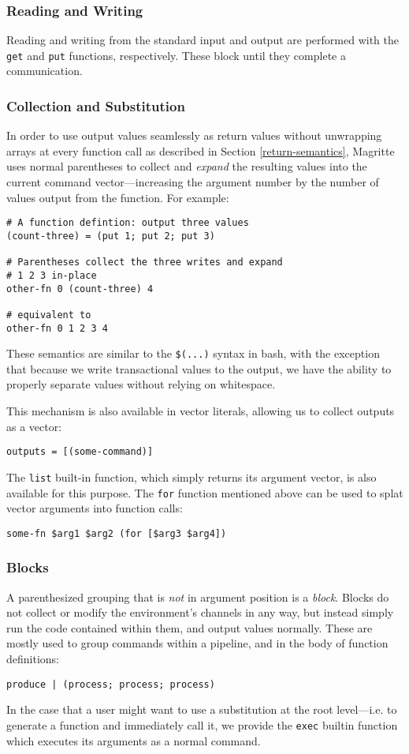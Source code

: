 \documentclass[english,PRO]{ipsj}
\begin{document}
\subsubsection{Reading and Writing}\noindent
Reading and writing from the standard input and output are performed with the \verb/get/ and \verb/put/ functions, respectively. These block until they complete a communication.

\subsubsection{Collection and Substitution}\noindent
In order to use output values seamlessly as return values without unwrapping arrays at every function call as described in Section \ref{return-semantics}, Magritte uses normal parentheses to collect and \emph{expand} the resulting values into the current command vector---increasing the argument number by the number of values output from the function. For example:
\begin{lstlisting}
# A function defintion: output three values
(count-three) = (put 1; put 2; put 3)

# Parentheses collect the three writes and expand
# 1 2 3 in-place
other-fn 0 (count-three) 4

# equivalent to
other-fn 0 1 2 3 4
\end{lstlisting}

\noindent
These semantics are similar to the \verb/$(...)/ syntax in bash, with the exception that because we write transactional values to the output, we have the ability to properly separate values without relying on whitespace.

This mechanism is also available in vector literals, allowing us to collect outputs as a vector:
\begin{lstlisting}
outputs = [(some-command)]
\end{lstlisting}
\noindent
The \verb/list/ built-in function, which simply returns its argument vector, is also available for this purpose.
The \verb/for/ function mentioned above can be used to splat vector arguments into function calls:
\begin{lstlisting}
some-fn $arg1 $arg2 (for [$arg3 $arg4])
\end{lstlisting}

\subsubsection{Blocks}\noindent
A parenthesized grouping that is \emph{not} in argument position is a \emph{block}. Blocks do not collect or modify the environment's channels in any way, but instead simply run the code contained within them, and output values normally. These are mostly used to group commands within a pipeline, and in the body of function definitions:
\begin{lstlisting}
produce | (process; process; process)
\end{lstlisting}
\noindent
In the case that a user might want to use a substitution at the root level---i.e. to generate a function and immediately call it, we provide the \verb/exec/ builtin function which executes its arguments as a normal command.
\end{document}
